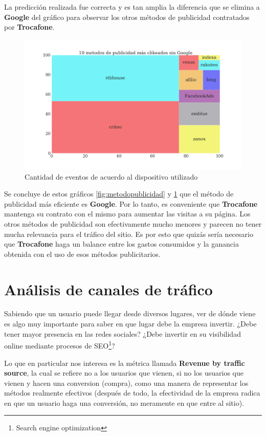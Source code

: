 \documentclass[a4paper]{article}
\begin{document}
La predicción realizada fue correcta y es tan amplia la diferencia que se elimina a \textbf{Google} del gráfico para observar los otros métodos de publicidad contratados por \textbf{Trocafone}.

\begin{figure}[h!]
	\includegraphics[width=\linewidth]{figures/171-publicidad_sin_google-barplot.png}
	\caption{Cantidad de eventos de acuerdo al dispositivo utilizado}
	\label{fig:metodopublicidadsingoogle}
\end{figure}

Se concluye de estos gráficos \ref{fig:metodopublicidad} y \ref{fig:metodopublicidadsingoogle} que el método de publicidad más eficiente es \textbf{Google}. Por lo tanto, es conveniente que \textbf{Trocafone} mantenga su contrato con el mismo para aumentar las visitas a su página. Los otros métodos de publicidad son efectivamente mucho menores y parecen no tener mucha relevancia para el tráfico del sitio. Es por esto que quizás sería necesario que \textbf{Trocafone} haga un balance entre los gastos consumidos y la ganancia obtenida con el uso de esos métodos publicitarios.

\section{Análisis de canales de tráfico}

Sabiendo que un usuario puede llegar desde diversos lugares, ver de dónde viene es algo muy importante para saber en que lugar debe la empresa invertir. ¿Debe tener mayor presencia en las redes sociales? ¿Debe invertir en su visibilidad online mediante procesos de SEO\footnote{Search engine optimization}? 

Lo que en particular nos interesa es la métrica llamada \textbf{Revenue by traffic source}, la cual se refiere no a los usuarios que vienen, si no los usuarios que vienen y hacen una conversion (compra), como una manera de representar los métodos realmente efectivos (después de todo, la efectividad de la empresa radica en que un usuario haga una conversión, no meramente en que entre al sitio).
\end{document}
